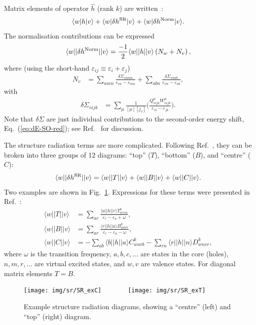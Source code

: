 \documentclass[10pt,twocolumn,a4paper]{article}%
\newcommand{\bra}[1]{\ensuremath{\langle #1|}}	%
\newcommand{\ket}[1]{\ensuremath{|#1\rangle}}
\newcommand{\be}{\begin{equation}}
\newcommand{\ee}{\end{equation}}
\def\en{\ensuremath{\varepsilon}}
\newcommand{\w}{\ensuremath{\omega}}
\begin{document}
Matrix elements of operator $\hat h$ (rank $k$) are written~\cite{Blundell1987,Dzuba1987jpbRPA}:
\be
\bra{w}h\ket{v} + \bra{w}\delta h^{\rm SR}\ket{v}+\bra{w}\delta h^{\rm Norm}\ket{v}.
\ee
The normalisation contributions can be expressed
\be
\bra{w}|\delta h^{\rm Norm}|\ket{v} = \frac{-1}{2}\bra{w}|h|\ket{v}\left(N_{w}  +  N_{v}\right),
\ee
where (using the short-hand $\en_{ij}\equiv\en_i+\en_j$)
\begin{align}
N_v &=
 \sum_{amn} \frac{\delta\Sigma_{vamn}}{\en_{va} - \en_{mn}}
+\sum_{abn}\frac{\delta\Sigma_{vnab}}{\en_{vn}-\en_{ab}} ,
\end{align}
with
\begin{align}
\delta\Sigma_{vijk} &=\sum_\mu \frac{1}{[\mu][j_v]}\Bigg(
\frac{Q^\mu_{vijk}W^\mu_{vijk}}{\en_{vi} - \en_{jk}}
 \Bigg).
\end{align}
Note that $\delta\Sigma$ are just individual contributions to the second-order energy shift, Eq.~(\ref{eq:dE-SO-red});
see Ref.~\cite{Dzuba1987jpbRPA} for discussion.








The structure radiation terms are more complicated.
Following Ref.~\cite{JohLiuSap96}, they can be broken into three groups of 12 diagrams: ``top'' ($T$), ``bottom'' ($B$), and ``centre'' ($C$):
\[
\bra{w}|\delta h^{\rm SR}|\ket{v} = \bra{w}|T|\ket{v} + \bra{w}|B|\ket{v} + \bra{w}|C|\ket{v}.
\]
Two examples are shown in Fig.~\ref{fig:SR-example}.
Expressions for these terms were presented in Ref.~\cite{JohLiuSap96}:
\begin{align}
\bra{w}|T|\ket{v} &= \sum_{ar} \frac{\bra{a}|h|\ket{r} T^k_{wrva}}{\en_r - \en_a + \w},\\
\bra{w}|B|\ket{v} &= \sum_{ar} \frac{\bra{r}|h|\ket{a} B^k_{wavr}}{\en_r - \en_a - \w},\\
\bra{w}|C|\ket{v} &= -\sum_{ab} {\bra{b}|h|\ket{a} C^{k}_{wavb}} - \sum_{rn} {\bra{r}|h|\ket{n} D^{k}_{wnvr}},
\end{align}
where $\omega$ is the transition frequency,
$a,b,c,...$ are states in the core (holes), $n,m,r,...$ are virtual excited states, and $w,v$ are valence states.
For diagonal matrix elements $T=B$.




\begin{figure}%
\centering\tiny
\texttt{[image: img/sr/SR\_exC]}~~~~~~~
\texttt{[image: img/sr/SR\_exT]}
\caption{\small Example structure radiation diagrams, showing a ``centre'' (left) and ``top'' (right) diagram.\label{fig:SR-example}}
\end{figure}
\end{document}
